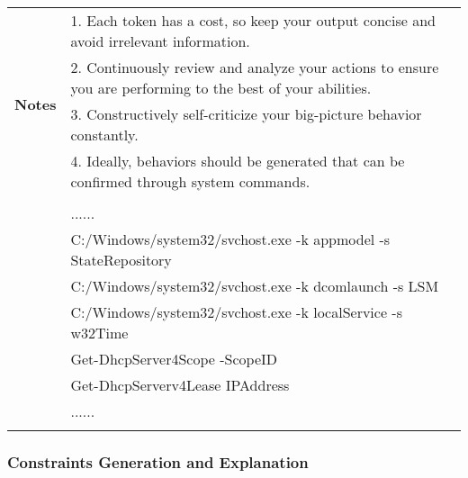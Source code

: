 \begin{tabularx}{\textwidth}{|c|X|}
\\ 
\hline
\multirow{5}{*}{\textbf{Notes}} 
& 1. Each token has a cost, so keep your output concise and avoid irrelevant information. \\
& 2. Continuously review and analyze your actions to ensure you are performing to the best of your abilities. \\
& 3. Constructively self-criticize your big-picture behavior constantly. \\
& 4. Ideally, behaviors should be generated that can be confirmed through system commands. \\
\hline
\textbf{\colorbox{codeorange}{LLM Response}} \\
& ...... \\
& C:/Windows/system32/svchost.exe -k appmodel -s StateRepository \\
& C:/Windows/system32/svchost.exe -k dcomlaunch -s LSM \\
& C:/Windows/system32/svchost.exe -k localService -s w32Time \\
& Get-DhcpServer4Scope -ScopeID \\
& Get-DhcpServerv4Lease IPAddress\\
& ...... \\
\\
\hline
\end{tabularx}

\clearpage

\subsubsection{Constraints Generation and Explanation}
\label{prompt-cons-explain}

